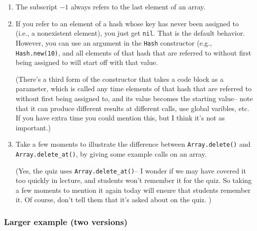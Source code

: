 \documentclass[12pt]{article}
\begin{document}
        \begin{enumerate}
  
          \addtolength{\itemsep}{.5mm}
  
          \item The subscript $-1$ always refers to the last element of an
                array.
  
          \item If you refer to an element of a hash whose key has never
                been assigned to (i.e., a nonexistent element), you just get
                \texttt{nil}.  That is the default behavior.  However, you
                can use an argument in the \texttt{Hash} constructor (e.g.,
                \texttt{Hash.new(10)}, and all elements of that hash that
                are referred to without first being assigned to will start
                off with that value.
  
                (There's a third form of the constructor that takes a code
                block as a parameter, which is called any time elements of
                that hash that are referred to without first being assigned
                to, and its value becomes the starting value-- note that it
                can produce different results at different calls, use global
                varibles, etc.  If you have extra time you could mention
                this, but I think it's not as important.)
  
          \item Take a few moments to illustrate the difference between
                \texttt{Array.delete()} and \texttt{Array.delete\_at()}, by
                giving some example calls on an array.
  
                (Yes, the quiz uses \texttt{Array.delete\_at()}-- I wonder
                  if we may have covered it too quickly in lecture, and
                 students won't remember it for the quiz.  So taking a few
                 moments to mention it again today will ensure that students
                 remember it.  Of course, don't tell them that it's asked
                 about on the quiz. \smiley)
                
        \end{enumerate}
  
        \vspace{-2.5mm}
  
      \subsubsection{Larger example (two versions)}
  
\end{document}
